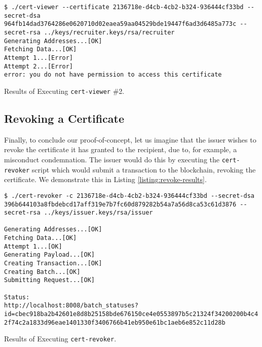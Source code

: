 \begin{listing}[ht]
	\begin{verbatim}
$ ./cert-viewer --certificate 2136718e-d4cb-4cb2-b324-936444cf33bd --secret-dsa 964fb14dad3764286e0620710d02eaea59aa04529bde19447f6ad3d6485a773c --secret-rsa ../keys/recruiter.keys/rsa/recruiter
Generating Addresses...[OK]
Fetching Data...[OK]
Attempt 1...[Error]
Attempt 2...[Error]
error: you do not have permission to access this certificate
\end{verbatim}
	\caption{Results of Executing \texttt{cert-viewer} \#2.}
	\label{listing:view-recruiter-revoke-results}
\end{listing}

\subsection{Revoking a Certificate}
\label{sec:impl-revoke}

Finally, to conclude our proof-of-concept, let us imagine that the issuer wishes to revoke the certificate it has granted to the recipient, due to, for example, a misconduct condemnation. The issuer would do this by executing the \texttt{cert-revoker} script which would submit a transaction to the blockchain, revoking the certificate. We demonstrate this in Listing \ref{listing:revoke-results}.

\begin{listing}[ht]
	\begin{verbatim}
$ ./cert-revoker -c 2136718e-d4cb-4cb2-b324-936444cf33bd --secret-dsa 396b644103a8fbdebcd17aff319e7b7fc60d879282b54a7a56d8ca53c61d3876 --secret-rsa ../keys/issuer.keys/rsa/issuer

Generating Addresses...[OK]
Fetching Data...[OK]
Attempt 1...[OK]
Generating Payload...[OK]
Creating Transaction...[OK]
Creating Batch...[OK]
Submitting Request...[OK]

Status:
http://localhost:8008/batch_statuses?id=cbec918ba2b42601e8d8b25158bde676150ce4e0553897b5c21324f34200200b4c4
2f74c2a1833d96eae1401330f3406766b41eb950e61bc1aeb6e852c11d28b

\end{verbatim}
	\caption{Results of Executing \texttt{cert-revoker}.}
	\label{listing:revoke-results}
\end{listing}

